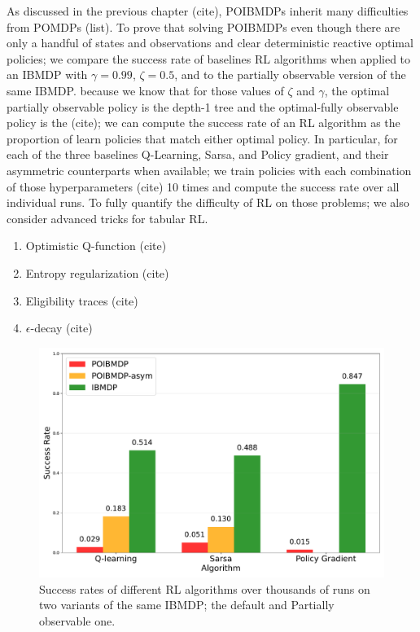 As discussed in the previous chapter (cite), POIBMDPs inherit many difficulties from POMDPs (list).
To prove that solving POIBMDPs even though there are only a handful of states and observations and clear deterministic reactive optimal policies; we compare the success rate of baselines RL algorithms when applied to an IBMDP with $\gamma=0.99$, $\zeta=0.5$, and to the partially observable version of the same IBMDP.
because we know that for those values of $\zeta$ and $\gamma$, the optimal partially observable policy is the depth-1 tree and the optimal-fully observable policy is the (cite); we can compute the success rate of an RL algorithm as the proportion of learn policies that match either optimal policy.
In particular, for each of the three baselines Q-Learning, Sarsa, and Policy gradient, and their asymmetric counterparts when available; we train policies with each combination of those hyperparameters (cite) 10 times and compute the success rate over all individual runs.
To fully quantify the difficulty of RL on those problems; we also consider advanced tricks for tabular RL.
\begin{enumerate}
    \item Optimistic Q-function (cite)
    \item Entropy regularization (cite)
    \item Eligibility traces (cite)
    \item $\epsilon$-decay (cite)
\end{enumerate}

\begin{figure}
    \centering
    \includegraphics[width=1\textwidth]{images/images_part1/algorithm_performance_comparison_flattened.pdf}
    \caption{Success rates of different RL algorithms over thousands of runs on two variants of the same IBMDP; the default and Partially observable one.}\label{fig:po-vs-ib}
\end{figure}

